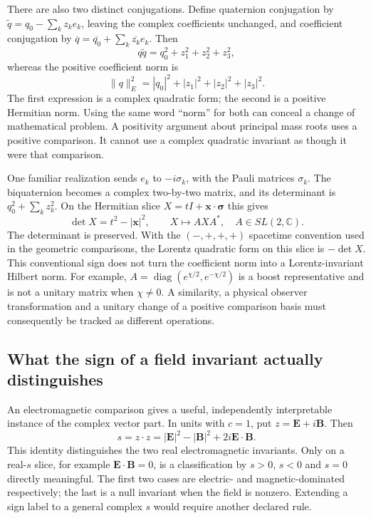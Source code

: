 There are also two distinct conjugations. Define quaternion conjugation
by $\widetilde q=q_0-\sum_kz_ke_k$, leaving the complex coefficients
unchanged, and coefficient conjugation by
$\overline q=\overline{q_0}+\sum_k\overline{z_k}e_k$. Then
\begin{equation}
 q\widetilde q=q_0^2+z_1^2+z_2^2+z_3^2,
\end{equation}
whereas the positive coefficient norm is
\begin{equation}
 \|q\|_E^2=|q_0|^2+|z_1|^2+|z_2|^2+|z_3|^2.
\end{equation}
The first expression is a complex quadratic form; the second is a
positive Hermitian norm. Using the same word ``norm'' for both can
conceal a change of mathematical problem. A positivity argument about
principal mass roots uses a positive comparison. It cannot use a
complex quadratic invariant as though it were that comparison.

One familiar realization sends $e_k$ to $-i\sigma_k$, with the Pauli
matrices $\sigma_k$. The biquaternion becomes a complex two-by-two
matrix, and its determinant is $q_0^2+\sum_kz_k^2$. On the Hermitian
slice $X=tI+\boldsymbol x\cdot\boldsymbol\sigma$ this gives
\begin{equation}
 \det X=t^2-|\boldsymbol x|^2,\qquad
 X\longmapsto AXA^*,\quad A\in SL(2,\mathbb C).
\end{equation}
The determinant is preserved. With the $(-,+,+,+)$ spacetime
convention used in the geometric comparisons, the Lorentz quadratic
form on this slice is $-\det X$. This conventional sign does not
turn the coefficient norm into a Lorentz-invariant Hilbert norm.
For example, $A=\operatorname{diag}(e^{\chi/2},e^{-\chi/2})$
is a boost representative and is not a unitary matrix when
$\chi\ne0$. A similarity, a physical observer transformation and
a unitary change of a positive comparison basis must consequently be
tracked as different operations.

\subsection{What the sign of a field invariant actually distinguishes}
An electromagnetic comparison gives a useful, independently interpretable
instance of the complex vector part. In units with $c=1$, put
$z=\boldsymbol E+i\boldsymbol B$. Then
\begin{equation}
 s=z\cdot z=|\boldsymbol E|^2-|\boldsymbol B|^2
                 +2i\boldsymbol E\cdot\boldsymbol B.
\end{equation}
This identity distinguishes the two real electromagnetic invariants.
Only on a real-$s$ slice, for example
$\boldsymbol E\cdot\boldsymbol B=0$, is a classification by
$s>0$, $s<0$ and $s=0$ directly meaningful. The first two cases are
electric- and magnetic-dominated respectively; the last is a null
invariant when the field is nonzero. Extending a sign label to a
general complex $s$ would require another declared rule.

